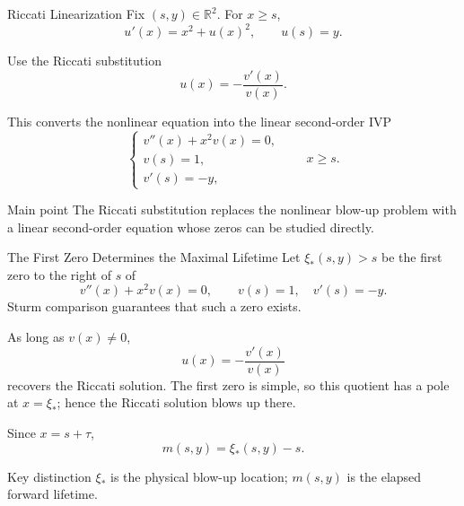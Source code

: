 \documentclass[aspectratio=169,11pt]{beamer}
\newcommand{\R}{\mathbb{R}}
\newcommand{\mstop}{m}
\begin{document}
\begin{frame}{Riccati Linearization}
\small
Fix \((s,y)\in\R^2\). For \(x\ge s\),
\[
u'(x)=x^2+u(x)^2,\qquad u(s)=y.
\]

Use the Riccati substitution
\[
\boxed{u(x)=-\frac{v'(x)}{v(x)}}.
\]

This converts the nonlinear equation into the linear second-order IVP
\[
\boxed{
\begin{cases}
v''(x)+x^2v(x)=0,\\
v(s)=1,\\
v'(s)=-y,
\end{cases}
\qquad x\ge s.}
\]

\begin{alertblock}{Main point}
The Riccati substitution replaces the nonlinear blow-up problem with a linear second-order equation whose zeros can be studied directly.
\end{alertblock}
\end{frame}

\begin{frame}{The First Zero Determines the Maximal Lifetime}
\small
Let \(\xi_*(s,y)>s\) be the first zero to the right of \(s\) of
\[
v''(x)+x^2v(x)=0,
\qquad
v(s)=1,\quad v'(s)=-y.
\]
Sturm comparison guarantees that such a zero exists.

As long as \(v(x)\neq0\),
\[
u(x)=-\frac{v'(x)}{v(x)}
\]
recovers the Riccati solution. The first zero is simple, so this quotient has a pole at \(x=\xi_*\); hence the Riccati solution blows up there.

Since \(x=s+\tau\),
\[
\boxed{\mstop(s,y)=\xi_*(s,y)-s.}
\]

\begin{alertblock}{Key distinction}
\(\xi_*\) is the physical blow-up location; \(m(s,y)\) is the elapsed forward lifetime.
\end{alertblock}
\end{frame}
\end{document}
